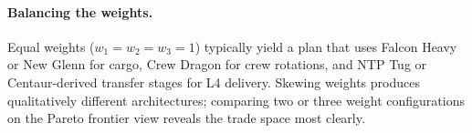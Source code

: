 \paragraph{Balancing the weights.}
Equal weights ($w_1 = w_2 = w_3 = 1$) typically yield a plan
that uses Falcon Heavy or New Glenn for cargo, Crew Dragon for
crew rotations, and NTP Tug or Centaur-derived transfer stages
for L4 delivery. Skewing weights produces qualitatively
different architectures; comparing two or three weight
configurations on the Pareto frontier view reveals the trade
space most clearly.
